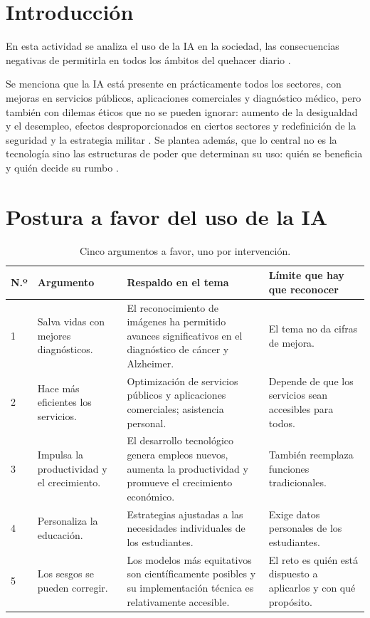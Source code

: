 \documentclass[11pt,letterpaper]{article}
\begin{document}
\portada
\indicegeneral

\section{Introducción}

En esta actividad se analiza el uso de la IA en la sociedad, las consecuencias negativas de permitirla en todos los ámbitos del quehacer diario \parencite{iae_u6_t62}.

Se menciona que la IA está presente en prácticamente todos los sectores, con mejoras en servicios públicos, aplicaciones comerciales y diagnóstico médico, pero también con dilemas éticos que no se pueden ignorar: aumento de la desigualdad y el desempleo, efectos desproporcionados en ciertos sectores y redefinición de la seguridad y la estrategia militar \parencite{iae_u6_t62}. Se plantea además, que lo central no es la tecnología sino las estructuras de poder que determinan su uso: quién se beneficia y quién decide su rumbo \parencite{iae_u6_t62}.

\section{Postura a favor del uso de la IA}

\begin{table}[H]
\centering
\scriptsize
\renewcommand{\arraystretch}{1.25}
\begin{tabularx}{\textwidth}{@{}p{0.6cm}p{3.1cm}Xp{3.6cm}@{}}
\toprule
\textbf{N.º} & \textbf{Argumento} & \textbf{Respaldo en el tema} & \textbf{Límite que hay que reconocer} \\
\midrule
1 & Salva vidas con mejores diagnósticos. & El reconocimiento de imágenes ha permitido avances significativos en el diagnóstico de cáncer y Alzheimer. & El tema no da cifras de mejora. \\
2 & Hace más eficientes los servicios. & Optimización de servicios públicos y aplicaciones comerciales; asistencia personal. & Depende de que los servicios sean accesibles para todos. \\
3 & Impulsa la productividad y el crecimiento. & El desarrollo tecnológico genera empleos nuevos, aumenta la productividad y promueve el crecimiento económico. & También reemplaza funciones tradicionales. \\
4 & Personaliza la educación. & Estrategias ajustadas a las necesidades individuales de los estudiantes. & Exige datos personales de los estudiantes. \\
5 & Los sesgos se pueden corregir. & Los modelos más equitativos son científicamente posibles y su implementación técnica es relativamente accesible. & El reto es quién está dispuesto a aplicarlos y con qué propósito. \\
\bottomrule
\end{tabularx}
\caption{Cinco argumentos a favor, uno por intervención.}\label{tab:favor}
\end{table}
\end{document}
